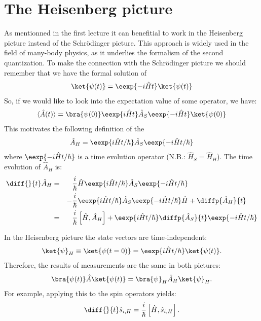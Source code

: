 \section{The Heisenberg picture}
As mentionned in the first lecture it can benefitial to work in the Heisenberg picture instead of the Schrödinger picture. This approach is widely used in the field of many-body physics, as it underlies the formalism of the second quantization. To make the connection with  the Schrödinger picture we should remember that we have the formal solution of
\begin{align}
\ket{\psi(t)} = \eexp{-i\hat{H}t}\ket{\psi(t)}
\end{align}
So, if we would like to look into the expectation value of some operator, we have:
\begin{align}
\langle\hat{A}(t)\rangle = \bra{\psi(0)}\eexp{i\hat{H}t}\hat{A}_S\eexp{-i\hat{H}t}\ket{\psi(0)}
\end{align}
This motivates the following definition of the 
\begin{align}
    \hat{A}_H=\eexp{i{\hat{H} t}/{\hbar}} \hat{A}_S \eexp{-i{\hat{H} t}/{\hbar}}
\end{align}
					where $\eexp{-i{\hat{H} t}/{\hbar}}$ is a time evolution operator (N.B.: $\hat{H}_S = \hat{H}_H$). The time evolution of $\hat{A}_H$ is:
					\begin{align}
						\notag \diff{}{t} \hat{A}_H &=&& \frac{i}{\hbar}\hat{H}\eexp{i{\hat{H}t}/{\hbar}}\hat{A}_S \eexp{-i{\hat{H} t}/{\hbar}}\\ 
						&&-&\frac{i}{\hbar} \eexp{i{\hat{H} t}/{\hbar}}\hat{A}_S \eexp{-i{\hat{H}t}/{\hbar}}\hat{H}+\diffp{\hat{A}_H}{t}\\
						&=&& \frac{i}{\hbar}\left[\hat{H},\hat{A}_H\right] + \eexp{i{\hat{H}t}/{\hbar}}\diffp{\hat{A}_S}{t}\eexp{-i{\hat{H}t}/{\hbar}}
					\end{align}

					In the Heisenberg picture the state vectors are time-in\-de\-pen\-dent:
					\begin{align}
						\ket{\psi}_H \equiv \ket{\psi(t=0)}=\eexp{i{\hat{H}}t/{\hbar}} \ket{\psi(t)}.
					\end{align}
					Therefore, the results of measurements are the same in both pictures:
					\begin{align}
						\bra{\psi(t)}\hat{A}\ket{\psi(t)} = \bra{\psi}_H \hat{A}_H \ket{\psi}_H.
					\end{align}
					For example, applying this to the spin operators yields:
					\begin{align}
						\diff{}{t}\hat{s}_{i,H}=\frac{i}{\hbar}\left[\hat{H},\hat{s}_{i,H}\right].
					\end{align}
